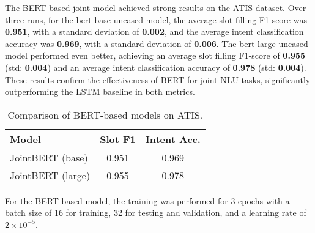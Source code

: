 \documentclass[a4paper]{article}
\begin{document}
The BERT-based joint model achieved strong results on the ATIS dataset. Over three runs, for the bert-base-uncased model, the average slot filling F1-score was \textbf{ 0.951}, with a standard deviation of \textbf{0.002}, and the average intent classification accuracy
 was \textbf{0.969}, with a standard deviation of \textbf{0.006}. The bert-large-uncased model performed even better, achieving an average slot filling F1-score of \textbf{0.955} (std: \textbf{0.004}) and an average intent classification accuracy of \textbf{0.978} (std: \textbf{0.004}). 
These results confirm the effectiveness of BERT for joint NLU tasks, significantly outperforming the LSTM baseline in both metrics.

\begin{table}[h!]
  \centering
  \begin{tabular}{lcc}
    \toprule
    \textbf{Model} & \textbf{Slot F1} & \textbf{Intent Acc.} \\
    \midrule
    JointBERT (base) & 0.951 & 0.969 \\
    JointBERT (large)   & 0.955 & 0.978 \\
    \bottomrule
  \end{tabular}
  \caption{Comparison of BERT-based models on ATIS.}
  \label{tab:results}
\end{table}

For the BERT-based model, the training was performed for 3 epochs with a batch size of 16 for 
training, 32 for testing and validation, and a learning rate of $2 \times 10^{-5}$.




\end{document}
